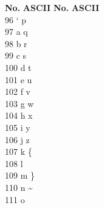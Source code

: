 \documentclass[10pt,letterpaper,twocolumn,twosided]{article}
\begin{document}
\begin{tabbing}
\textbf{No.}\hspace{1cm} \=  \textbf{ASCII}\hspace{2cm} \= \textbf{No.}\hspace{1cm} \= \textbf{ASCII}\hspace{2cm}  \\ 
96 \> `  \> p \\
97 \> a  \> q \\
98 \> b  \> r \\
99 \> c  \> s \\
100 \> d  \> t \\
101 \> e  \> u \\
102 \> f  \> v \\
103 \> g  \> w \\
104 \> h  \> x \\
105 \> i  \> y \\
106 \> j  \> z \\
107 \> k  \> \{ \\
108 \> l  \> \textbar \\
109 \> m  \> \} \\
110 \> n  \> \textasciitilde \\
111 \> o  \>  \\  
\end{tabbing}
\end{document}
